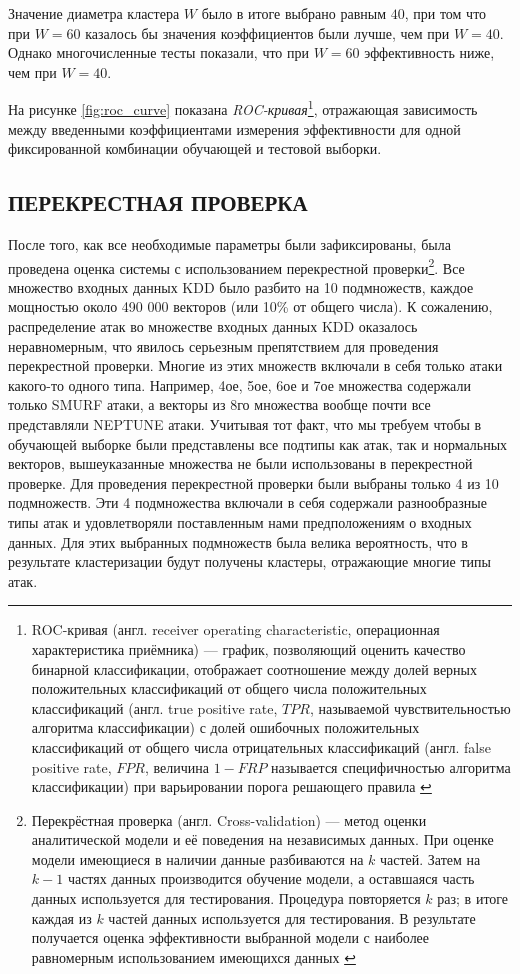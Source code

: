 \documentclass[12pt,a4paper]{article}
\begin{document}
Значение диаметра кластера $W$ было в итоге выбрано равным $40$, при том что при $W=60$ казалось бы значения коэффициентов были лучше, чем при $W=40$. Однако многочисленные тесты показали, что при $W=60$ эффективность ниже, чем при $W=40$.

На рисунке \ref{fig:roc_curve} показана \textit{ROC-кривая}\footnote{ROC-кривая (англ. receiver operating characteristic, операционная характеристика приёмника) — график, позволяющий оценить качество бинарной классификации, отображает соотношение между долей верных положительных классификаций от общего числа положительных классификаций (англ. true positive rate, $TPR$, называемой чувствительностью алгоритма классификации) с долей ошибочных положительных классификаций от общего числа отрицательных классификаций 
(англ. false positive rate, $FPR$, величина $1-FRP$ называется специфичностью алгоритма классификации) при варьировании порога решающего правила \cite{bib:wiki_roc} }, отражающая зависимость между введенными коэффициентами измерения эффективности для одной фиксированной комбинации обучающей и тестовой выборки.

\subsection{ПЕРЕКРЕСТНАЯ ПРОВЕРКА}

После того, как все необходимые параметры были зафиксированы, была проведена оценка системы с использованием перекрестной
проверки\footnote{Перекрёстная проверка (англ. Cross-validation) — метод оценки аналитической модели и её поведения на независимых данных. При оценке модели имеющиеся в наличии данные разбиваются на $k$ частей. Затем на $k-1$ частях данных производится обучение модели,
а оставшаяся часть данных используется для тестирования. Процедура повторяется $k$ раз; в итоге каждая из $k$ частей данных
используется для тестирования. В результате получается оценка эффективности выбранной модели с наиболее равномерным
использованием имеющихся данных \cite{bib:wiki_cross_validation}}. Все множество входных данных KDD было разбито на 10 подмножеств,
каждое мощностью около 490 000 векторов (или 10\% от общего числа). К сожалению, распределение атак во множестве входных
данных KDD оказалось неравномерным, что явилось серьезным препятствием для проведения перекрестной проверки. Многие из этих множеств
включали в себя только атаки какого-то одного типа. Например, 4ое, 5ое, 6ое и 7ое множества содержали только SMURF атаки, а векторы из 8го
множества вообще почти все представляли NEPTUNE атаки. Учитывая тот факт, что мы требуем чтобы в обучающей выборке были представлены
все подтипы как атак, так и нормальных векторов, вышеуказанные множества не были использованы в перекрестной проверке. Для проведения
перекрестной проверки были выбраны только 4 из 10 подмножеств. Эти 4 подмножества включали в себя содержали разнообразные типы атак и
удовлетворяли поставленным нами предположениям о входных данных. Для этих выбранных подмножеств была велика вероятность, что
в результате кластеризации будут получены кластеры, отражающие многие типы атак.
\end{document}
